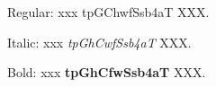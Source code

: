 \documentclass{article}
\begin{document}
Regular: xxx {\ffdings \textup{tpGChwfSsb4aT}} XXX.

Italic: xxx {\ffdings \textit{tpGhCwfSsb4aT}} XXX.

Bold: xxx {\ffdings \textbf{tpGhCfwSsb4aT}} XXX.
\end{document}
